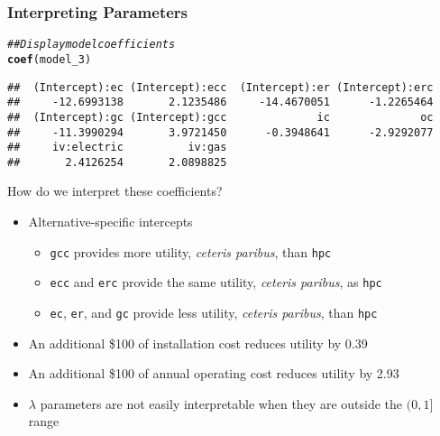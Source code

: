 \documentclass{beamer}\usepackage[]{graphicx}\usepackage[]{color}
\makeatletter
\newcommand{\hlcom}[1]{\textcolor[rgb]{0.678,0.584,0.686}{\textit{#1}}}%
\newcommand{\hlstd}[1]{\textcolor[rgb]{0.345,0.345,0.345}{#1}}%
\newcommand{\hlkwd}[1]{\textcolor[rgb]{0.737,0.353,0.396}{\textbf{#1}}}%
\newenvironment{kframe}{%
 \def\at@end@of@kframe{}%
 \ifinner\ifhmode%
  \def\at@end@of@kframe{\end{minipage}}%
  \begin{minipage}{\columnwidth}%
 \fi\fi%
 \def\FrameCommand##1{\hskip\@totalleftmargin \hskip-\fboxsep
 \colorbox{shadecolor}{##1}\hskip-\fboxsep
     \hskip-\linewidth \hskip-\@totalleftmargin \hskip\columnwidth}%
 \MakeFramed {\advance\hsize-\width
   \@totalleftmargin\z@ \linewidth\hsize
   \@setminipage}}%
 {\par\unskip\endMakeFramed%
 \at@end@of@kframe}
\newenvironment{knitrout}{}{} %
\makeatother
\begin{document}
\begin{frame}[fragile]\frametitle{Interpreting Parameters}
\begin{knitrout}\footnotesize
{}\color{fgcolor}\begin{kframe}
\begin{alltt}
\hlcom{## Display model coefficients}
\hlkwd{coef}\hlstd{(model_3)}
\end{alltt}
\begin{verbatim}
##  (Intercept):ec (Intercept):ecc  (Intercept):er (Intercept):erc 
##     -12.6993138       2.1235486     -14.4670051      -1.2265464 
##  (Intercept):gc (Intercept):gcc              ic              oc 
##     -11.3990294       3.9721450      -0.3948641      -2.9292077 
##     iv:electric          iv:gas 
##       2.4126254       2.0898825
\end{verbatim}
\end{kframe}
\end{knitrout}
    \vspace{2ex}
    How do we interpret these coefficients?
    \begin{itemize}
    	\item Alternative-specific intercepts
    	\begin{itemize}
    		\item \texttt{gcc} provides more utility, \emph{ceteris paribus}, than \texttt{hpc}
	      \item \texttt{ecc} and \texttt{erc} provide the same utility, \emph{ceteris paribus}, as \texttt{hpc}
	      \item \texttt{ec}, \texttt{er}, and \texttt{gc} provide less utility, \emph{ceteris paribus}, than \texttt{hpc}
    	\end{itemize}
        \item An additional \$100 of installation cost reduces utility by 0.39
        \item An additional \$100 of annual operating cost reduces utility by 2.93
        \item $\lambda$ parameters are not easily interpretable when they are outside the $(0, 1]$ range
    \end{itemize}
\end{frame}
\end{document}
